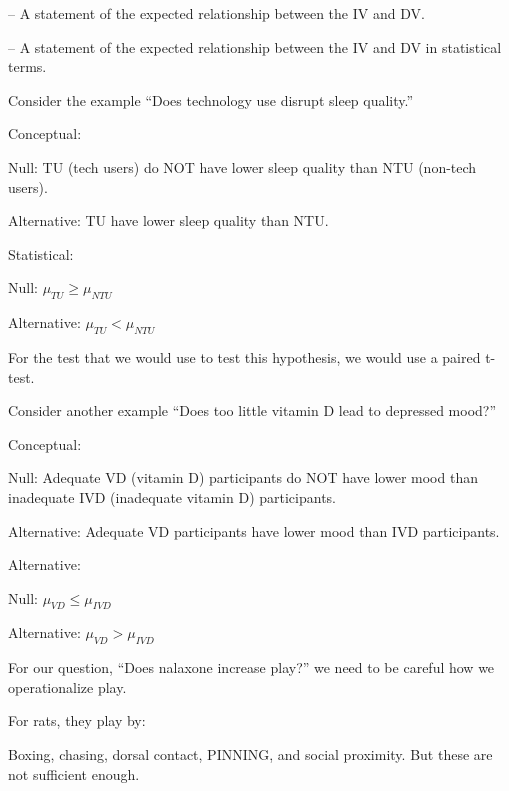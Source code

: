 \begin{coloredlist}
    \item {} -- A statement of the expected relationship between the IV and DV.
    \item {} -- A statement of the expected relationship between the IV and DV in statistical terms.
    \item Consider the example ``Does technology use disrupt sleep quality.''
    \begin{coloredlist}
        \item Conceptual: 
        \begin{coloredlist}
            \item Null: TU (tech users) do NOT have lower sleep quality than NTU (non-tech users).
            \item Alternative: TU have lower sleep quality than NTU.
        \end{coloredlist} 
        \item Statistical:
        \begin{coloredlist}
            \item Null: \(\mu_{TU} \geq \mu_{NTU}\)
            \item Alternative: \(\mu_{TU} < \mu_{NTU}\)
        \end{coloredlist}
        \item For the test that we would use to test this hypothesis, we would use a paired t-test.
    \end{coloredlist}
    \item Consider another example ``Does too little vitamin D lead to depressed mood?''
    \begin{coloredlist}
        \item Conceptual:
        \begin{coloredlist}
            \item Null: Adequate VD (vitamin D) participants do NOT have lower mood than inadequate IVD (inadequate vitamin D) participants.
            \item Alternative: Adequate VD participants have lower mood than IVD participants.  
        \end{coloredlist}
        \item Alternative:
        \begin{coloredlist}
            \item Null: \(\mu_{VD} \leq \mu_{IVD}\)
            \item Alternative: \(\mu_{VD} > \mu_{IVD}\)
        \end{coloredlist}
    \end{coloredlist}
    \item For our question, ``Does nalaxone increase play?'' we need to be careful how we operationalize play.
    \item For rats, they play by:
    \begin{coloredlist}
        \item Boxing, chasing, dorsal contact, PINNING, and social proximity. But these are not sufficient enough.
    \end{coloredlist}
\end{coloredlist}

